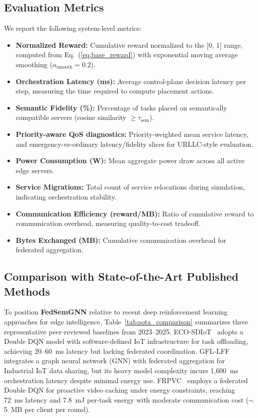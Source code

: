 \documentclass[conference]{IEEEtran}
\begin{document}
	\subsection{Evaluation Metrics}
	We report the following system-level metrics:
	\begin{itemize}
		\item \textbf{Normalized Reward:} Cumulative reward normalized to the [0, 1] range, computed from Eq.~(\ref{eq:base_reward}) with exponential moving average smoothing ($\alpha_{\text{smooth}} = 0.2$).
		\item \textbf{Orchestration Latency (ms):} Average control-plane decision latency per step, measuring the time required to compute placement actions.
		\item \textbf{Semantic Fidelity (\%):} Percentage of tasks placed on semantically compatible servers (cosine similarity $\geq \tau_{\text{sem}}$).
		\item \textbf{Priority-aware QoS diagnostics:} Priority-weighted mean service latency, and emergency-vs-ordinary latency/fidelity slices for URLLC-style evaluation.
		\item \textbf{Power Consumption (W):} Mean aggregate power draw across all active edge servers.
		\item \textbf{Service Migrations:} Total count of service relocations during simulation, indicating orchestration stability.
		\item \textbf{Communication Efficiency (reward/MB):} Ratio of cumulative reward to communication overhead, measuring quality-to-cost tradeoff.
		\item \textbf{Bytes Exchanged (MB):} Cumulative communication overhead for federated aggregation.
	\end{itemize}
	
	\subsection{Comparison with State-of-the-Art Published Methods}
	\label{subsec:sota_comparison}
	
	To position \textbf{FedSemGNN} relative to recent deep reinforcement learning approaches for edge intelligence, Table~\ref{tab:sota_comparison} summarizes three representative peer-reviewed baselines from 2023--2025. 
	ECO-SDIoT~\cite{zhu2023eco} adopts a Double DQN model with software-defined IoT infrastructure for task offloading, achieving 20--60~ms latency but lacking federated coordination. 
	GFL-LFF~\cite{regan2024gfl} integrates a graph neural network (GNN) with federated aggregation for Industrial IoT data sharing, but its heavy model complexity incurs 1{,}600~ms orchestration latency despite minimal energy use. 
	FRPVC~\cite{qian2025frpvc} employs a federated Double DQN for proactive video caching under energy constraints, reaching 72~ms latency and 7.8~mJ per-task energy with moderate communication cost ($\sim$5~MB per client per round). 
	
\end{document}
